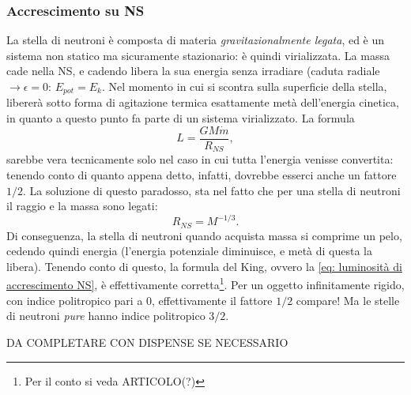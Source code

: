 \subsubsection{Accrescimento su NS}
La stella di neutroni è composta di materia \textit{gravitazionalmente legata}, ed è un sistema non statico ma sicuramente stazionario: è quindi virializzata.
La massa cade nella NS, e cadendo libera la sua energia senza irradiare (caduta radiale $\xrightarrow{}\epsilon=0 $: $E_{pot}=E_k$.
Nel momento in cui si scontra sulla superficie della stella, libererà sotto forma di agitazione termica esattamente metà dell'energia cinetica, in quanto a questo punto fa parte di un sistema virializzato.
La formula 
\begin{equation}
    L=\frac{GM\dot{m}}{R_{NS}},
    \label{eq: luminosità di accrescimento NS}
\end{equation}
sarebbe vera tecnicamente solo nel caso in cui tutta l'energia venisse convertita: tenendo conto di quanto appena detto, infatti, dovrebbe esserci anche un fattore $1/2$.
La soluzione di questo paradosso, sta nel fatto che per una stella di neutroni il raggio e la massa sono legati:
\begin{equation}
    R_{NS}=M^{-1/3}.   
\end{equation}
Di conseguenza, la stella di neutroni quando acquista massa si comprime un pelo, cedendo quindi energia (l'energia potenziale diminuisce, e metà di questa la libera).
Tenendo conto di questo, la formula del King, ovvero la \eqref{eq: luminosità di accrescimento NS}, è effettivamente corretta\footnote{Per il conto si veda ARTICOLO(?)}.
Per un oggetto infinitamente rigido, con indice politropico pari a $0$, effettivamente il fattore $1/2$ compare! 
Ma le stelle di neutroni \textit{pure} hanno indice politropico $3/2$.

DA COMPLETARE CON DISPENSE SE NECESSARIO
